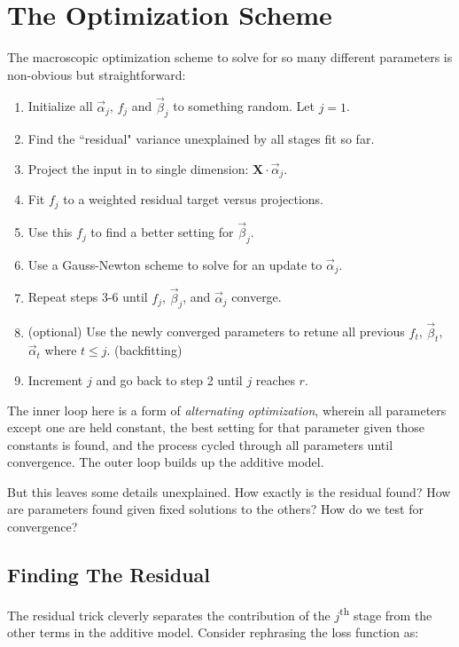 \documentclass[12pt]{article}
\begin{document}
\section{The Optimization Scheme}

The macroscopic optimization scheme to solve for so many different parameters is non-obvious but straightforward:
\begin{enumerate}
	\setlength\itemsep{-2mm}
	\item Initialize all $\vec{\alpha}_j$, $f_j$ and $\vec{\beta}_j$ to something random. Let $j=1$. 
	\item Find the ``residual" variance unexplained by all stages fit so far.
	\item Project the input in to single dimension: $\pmb{X} \cdot \vec{\alpha}_j$.
	\item Fit $f_j$ to a weighted residual target versus projections.
	\item Use this $f_j$ to find a better setting for $\vec{\beta}_j$.
	\item Use a Gauss-Newton scheme to solve for an update to $\vec{\alpha}_j$.
	\item Repeat steps 3-6 until $f_j$, $\vec{\beta}_j$, and $\vec{\alpha}_j$ converge.
	\item (optional) Use the newly converged parameters to retune all previous $f_t$, $\vec{\beta}_t$, $\vec{\alpha}_t$ where $t \leq j$. (backfitting)
	\item Increment $j$ and go back to step 2 until $j$ reaches $r$.
\end{enumerate}

The inner loop here is a form of \textit{alternating optimization}, wherein all parameters except one are held constant, the best setting for that parameter given those constants is found, and the process cycled through all parameters until convergence. The outer loop builds up the additive model.

But this leaves some details unexplained. How exactly is the residual found? How are parameters found given fixed solutions to the others? How do we test for convergence?

\subsection{Finding The Residual}

The residual trick cleverly separates the contribution of the $j$\textsuperscript{th} stage from the other terms in the additive model. Consider rephrasing the loss function as:
\end{document}
